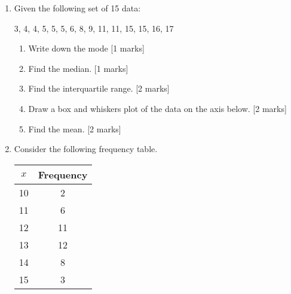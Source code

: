 \documentclass[12pt, twoside]{article}
\begin{document}
\begin{enumerate}
\item Given the following set of 15 data:
    \begin{center}
    3, 4, 4, 5, 5, 5, 6, 8, 9, 11, 11, 15, 15, 16, 17
  \end{center}
  \begin{enumerate}
    \item Write down the mode \hfill [1 marks] \vspace{1cm}
    \item Find the median. \hfill [1 marks] \vspace{1.5cm}
    \item Find the interquartile range. \hfill [2 marks] \vspace{1cm}
    \item Draw a box and whiskers plot of the data on the axis below. \hfill [2 marks] \vspace{1cm}
      \begin{center}
      \end{center} \vspace{1cm}
      \item Find the mean. \hfill [2 marks]
    \end{enumerate}

\newpage
\item Consider the following frequency table.
\begin{center}
  \begin{tabular}{|c|c|}
    \hline
    $x$ & Frequency\\ 
    \hline 
    10 & 2 \\ 
    \hline 
    11 & 6 \\ 
    \hline 
    12 & 11 \\ 
    \hline 
    13 & 12 \\ 
    \hline 
    14 & 8 \\ 
    \hline 
    15 & 3 \\ 
    \hline 
    \end{tabular}
\end{center}


\end{enumerate}
\end{document}
